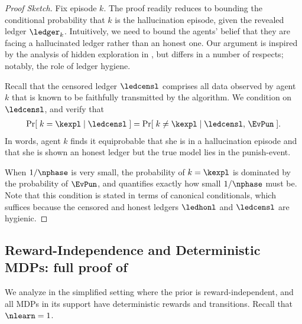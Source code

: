 \begin{proof}[Proof Sketch]
Fix episode $k$. The proof readily reduces to bounding the conditional probability that $k$ is the hallucination episode, given the revealed ledger $\ledger_k$. Intuitively, we need to bound the agents' belief that they are facing a hallucinated ledger rather than an honest one. Our argument is inspired by the analysis of hidden exploration in \cite{ICexploration-ec15}, but differs in a number of respects; notably, the role of ledger hygiene.

Recall that the censored ledger $\ledcensl$ comprises all data observed by agent $k$ that is known to be faithfully transmitted by the algorithm. We condition on $\ledcensl$, and verify that
\begin{align}\label{eq:Prhall_ledhall}
\Pr[\; k=\kexpl \mid \ledcensl \;] = \Pr[\; k\neq\kexpl \mid \ledcensl,\, \EvPun\;].
\end{align}
In words, agent $k$ finds it equiprobable that she is in a hallucination episode and that she is shown an honest ledger but the true model lies in the punish-event.

When $1/\nphase$ is very small, the probability of $k = \kexpl$ is dominated by the probability of $\EvPun$, and  quantifies exactly how small $1/\nphase$ must be. Note that this condition is stated in terms of canonical conditionals, which suffices because the censored and honest ledgers $\ledhonl$ and $\ledcensl$ are hygienic.
\end{proof}

\subsection{Reward-Independence and Deterministic MDPs: full proof of }
\label{sec:det_transitions}

We analyze  in the simplified setting where the prior is reward-independent, and all MDPs in its support have deterministic rewards and transitions.  Recall that $\nlearn = 1$.

